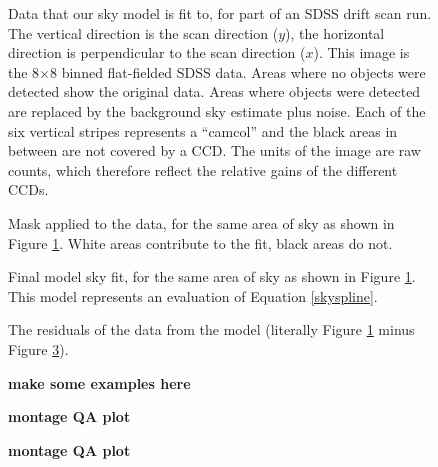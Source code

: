 \clearpage

\setcounter{thefigs}{0}

\clearpage
{}
\begin{figure}
\figurenum{\fignum}
\caption{\label{fig:rawrun} Data that our sky model is fit to, for
part of an SDSS drift scan run.  The vertical direction is the scan
direction ($y$), the horizontal direction is perpendicular to the scan
direction ($x$). This image is the 8$\times$8 binned flat-fielded SDSS
data. Areas where no objects were detected show the original data.
Areas where objects were detected are replaced by the background sky
estimate plus noise. Each of the six vertical stripes represents a
``camcol'' and the black areas in between are not covered by a
CCD. The units of the image are raw counts, which therefore reflect
the relative gains of the different CCDs. }
\end{figure}

\clearpage
{}
\begin{figure}
\figurenum{\fignum}
\caption{\label{fig:mask} Mask applied to the data, for the same area
of sky as shown in Figure \ref{fig:rawrun}. White areas contribute to
the fit, black areas do not.}
\end{figure}

\clearpage
{}
\begin{figure}
\figurenum{\fignum}
\caption{\label{fig:model} Final model sky fit, for the same area of
sky as shown in Figure \ref{fig:rawrun}. This model represents an
evaluation of Equation \ref{skyspline}.}
\end{figure}

\clearpage
{}
\begin{figure}
\figurenum{\fignum}
\caption{\label{fig:resid} The residuals of the data from the model
(literally Figure \ref{fig:rawrun} minus Figure \ref{fig:model}).}
\end{figure}

\clearpage
{}
\begin{figure}
\figurenum{\fignum}
\caption{\label{fig:examples} {\bf make some examples here}}
\end{figure}

\clearpage
{}
\begin{figure}
\figurenum{\fignum}
\caption{\label{fig:montageqa} {\bf montage QA plot}}
\end{figure}

\clearpage
{}
\begin{figure}
\figurenum{\fignum}
\caption{\label{fig:montageqa} {\bf montage QA plot}}
\end{figure}

